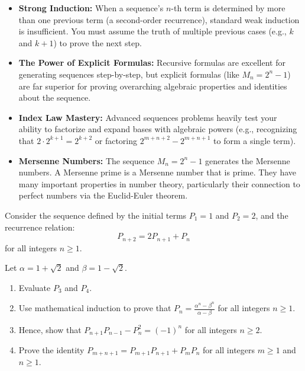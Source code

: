 \begin{takeaways}
\begin{itemize}[leftmargin=*]
    \item \textbf{Strong Induction:} When a sequence's $n$-th term is determined by more than one previous term (a second-order recurrence), standard weak induction is insufficient. You must assume the truth of multiple previous cases (e.g., $k$ and $k+1$) to prove the next step.
    \item \textbf{The Power of Explicit Formulas:} Recursive formulas are excellent for generating sequences step-by-step, but explicit formulas (like $M_n = 2^n - 1$) are far superior for proving overarching algebraic properties and identities about the sequence.
    \item \textbf{Index Law Mastery:} Advanced sequences problems heavily test your ability to factorize and expand bases with algebraic powers (e.g., recognizing that $2 \cdot 2^{k+1} = 2^{k+2}$ or factoring $2^{m+n+2} - 2^{m+n+1}$ to form a single term).
    \item \textbf{Mersenne Numbers:} The sequence $M_n = 2^n - 1$ generates the Mersenne numbers. A Mersenne prime is a Mersenne number that is prime. They have many important properties in number theory, particularly their connection to perfect numbers via the Euclid-Euler theorem.
\end{itemize}
\end{takeaways}

\begin{problem}
Consider the sequence defined by the initial terms $P_1 = 1$ and $P_2 = 2$, and the recurrence relation:
\[
P_{n+2} = 2P_{n+1} + P_n
\]
for all integers $n \ge 1$.

Let $\alpha = 1+\sqrt{2}$ and $\beta = 1-\sqrt{2}$.

\begin{enumerate}[label=\roman*., leftmargin=*]
    \item Evaluate $P_3$ and $P_4$.
    \item Use mathematical induction to prove that $P_n = \frac{\alpha^n - \beta^n}{\alpha - \beta}$ for all integers $n \ge 1$.
    \item Hence, show that $P_{n+1}P_{n-1} - P_n^2 = (-1)^n$ for all integers $n \ge 2$.
    \item Prove the identity $P_{m+n+1} = P_{m+1}P_{n+1} + P_m P_n$ for all integers $m \ge 1$ and $n \ge 1$.
\end{enumerate}
\end{problem}

